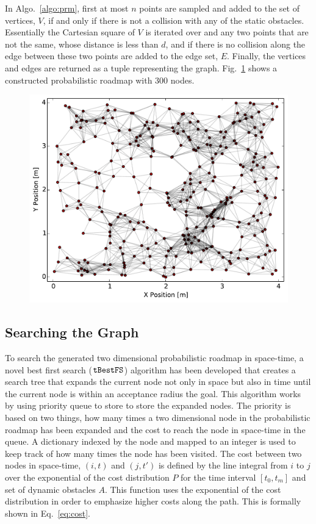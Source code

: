 
In Algo.~\ref{algo:prm}, first at most $n$ points are sampled and added to the
set of vertices, $V$, if and only if there is not a collision with any of the
static obstacles. Essentially the Cartesian square of $V$ is iterated over and
any two points that are not the same, whose distance is less than $d$, and if
there is no collision along the edge between these two points are added to the
edge set, $E$. Finally, the vertices and edges are returned as a tuple
representing the graph. Fig.~\ref{fig:prm} shows a constructed probabilistic
roadmap with 300 nodes.

\begin{figure}[h!]
    \centering
    \includegraphics[width=0.8\linewidth]{figs/roadmap}
    \caption{}
    \label{fig:prm}
\end{figure}

\subsection{Searching the Graph}

To search the generated two dimensional probabilistic roadmap in space-time, a
novel best first search ($\Acronym{tBestFS}$) algorithm has been developed that
creates a search tree that expands the current node not only in space but also
in time until the current node is within an acceptance radius the goal. This
algorithm works by using priority queue to store to store the expanded nodes.
The priority is based on two things, how many times a two dimensional node in
the probabilistic roadmap has been expanded and the cost to reach the node in
space-time in the queue. A dictionary indexed by the node and mapped to an
integer is used to keep track of how many times the node has been visited. The
cost between two nodes in space-time, $(i, t)$ and $(j, t')$ is defined by the
line integral from $i$ to $j$ over the exponential of the cost distribution $P$
for the time interval $[t_0, t_m]$ and set of dynamic obstacles $A$. This
function uses the exponential of the cost distribution in order to emphasize
higher costs along the path. This is formally shown in Eq.~\ref{eq:cost}.

